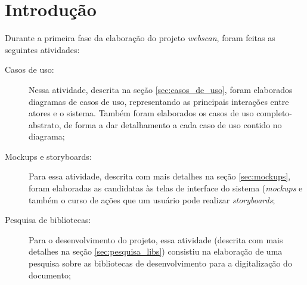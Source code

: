 \section{Introdução}
\label{sec:intro}

Durante a primeira fase da elaboração do projeto {\it webscan}, foram feitas as seguintes atividades:

\begin{description}
    \item[Casos de uso: ] Nessa atividade, descrita na seção \ref{sec:casos_de_uso}, foram elaborados diagramas de casos de uso, representando as principais interações entre atores e o sistema. Também foram elaborados os casos de uso completo-abstrato, de forma a dar detalhamento a cada caso de uso contido no diagrama;
    \item[Mockups e storyboards: ] Para essa atividade, descrita com mais detalhes na seção \ref{sec:mockups}, foram elaboradas as candidatas às telas de interface do sistema ({\it mockups} e também o curso de ações que um usuário pode realizar {\it storyboards};
    \item[Pesquisa de bibliotecas: ] Para o desenvolvimento do projeto, essa atividade (descrita com mais detalhes na seção \ref{sec:pesquisa_libs}) consistiu na elaboração de uma pesquisa sobre as bibliotecas de desenvolvimento para a digitalização do documento;
\end{description}

